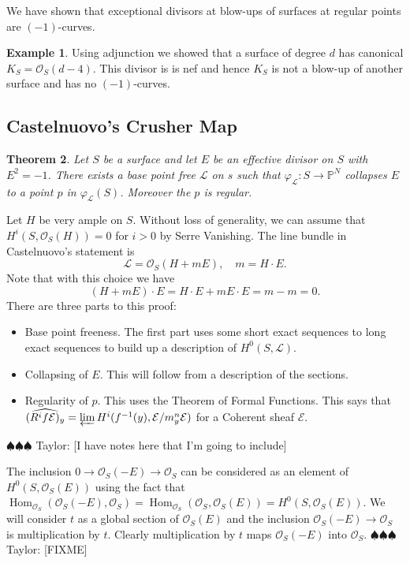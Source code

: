 \documentclass[12pt]{article}
\numberwithin{equation}{section}
\newtheorem{theorem}{Theorem}[subsection]
\theoremstyle{definition}
\newtheorem{example}[theorem]{Example}
\theoremstyle{remark}
\newcommand{\Hom}{\operatorname{Hom}}
\newcommand{\Ocal}{\mathcal{O}}
\newcommand{\PP}{\mathbb{P}}
\newcommand{\Lcal}{\mathcal{L}}
\newcommand{\Ecal}{\mathcal{E}}
\newcommand{\taylor}[1]{{\color{blue} \sf $\spadesuit\spadesuit\spadesuit$ Taylor: [#1]}}
\begin{document}
We have shown that exceptional divisors at blow-ups of surfaces at regular points are  $(-1)$-curves. 
\begin{example}
	Using adjunction we showed that a surface of degree $d$ has canonical $K_S =\Ocal_S(d-4)$. 
	This divisor is is nef and hence $K_S$ is not a blow-up of another surface and has no $(-1)$-curves.
\end{example}

\subsection{Castelnuovo's Crusher Map}

\begin{theorem}
	Let $S$ be a surface and let $E$ be an effective divisor on $S$ with $E^2=-1$. 
	There exists a base point free $\Lcal$ on $s$ such that $\varphi_{\Lcal}:S \to \PP^N$ collapses $E$ to a point $p$ in $\varphi_{\Lcal}(S)$.
	Moreover the $p$ is regular.
\end{theorem}
Let $H$ be very ample on $S$.
Without loss of generality, we can assume that $H^i(S,\Ocal_S(H))=0$ for $i>0$ by Serre Vanishing. 
The line bundle in Castelnuovo's statement is 
$$ \Lcal = \Ocal_S(H+mE), \quad m = H\cdot E.$$
Note that with this choice we have 
$$ (H+mE) \cdot E = H\cdot E + m E\cdot E = m-m=0. $$
There are three parts to this proof:
\begin{itemize}
	\item Base point freeness. The first part uses some short exact sequences to long exact sequences to build up a description of $H^0(S,\Lcal)$. 
	\item Collapsing of $E$. This will follow from a description of the sections. 
	\item Regularity of $p$.  This uses the Theorem of Formal Functions. This says that $\widehat{(R^if\Ecal)_y} = \varprojlim H^i( f^{-1}(y), \Ecal/m_y^n\Ecal )$ for a Coherent sheaf $\Ecal$.
\end{itemize}

\taylor{I have notes here that I'm going to include}

\iffalse 
The inclusion $0 \to \Ocal_S(-E) \to \Ocal_S$ can be considered as an element of $H^0(S,\Ocal_S(E))$ using the fact that $\Hom_{\Ocal_S}(\Ocal_S(-E),\Ocal_S) = \Hom_{\Ocal_S}(\Ocal_S,\Ocal_S(E)) = H^0(S,\Ocal_S(E))$. 
We will consider $t$ as a global section of $\Ocal_S(E)$ and the inclusion $\Ocal_S(-E) \to \Ocal_S$ is multiplication by $t$. 
Clearly multiplication by $t$ maps $\Ocal_S(-E)$ into $\Ocal_S$. \taylor{FIXME}
\end{document}
